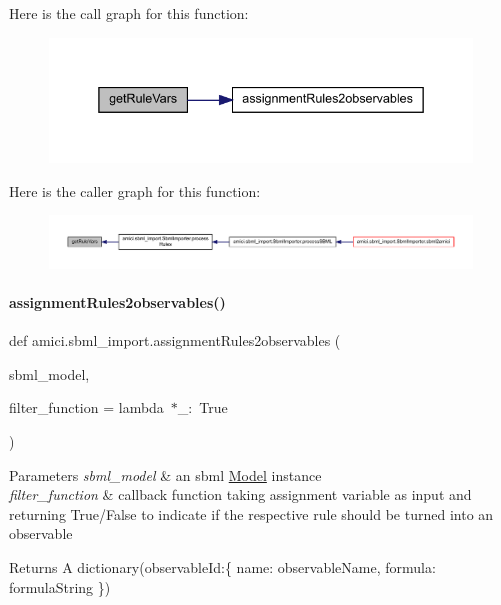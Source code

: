 Here is the call graph for this function\+:
\nopagebreak
\begin{figure}[H]
\begin{center}
\leavevmode
\includegraphics[width=338pt]{namespaceamici_1_1sbml__import_a64a5d0187cb4b3f69bceceb7d5638691_cgraph}
\end{center}
\end{figure}
Here is the caller graph for this function\+:
\nopagebreak
\begin{figure}[H]
\begin{center}
\leavevmode
\includegraphics[width=350pt]{namespaceamici_1_1sbml__import_a64a5d0187cb4b3f69bceceb7d5638691_icgraph}
\end{center}
\end{figure}
\mbox{\label{namespaceamici_1_1sbml__import_aaba72ac8b7d363e7720f36495ccc3285}} 
\paragraph{\texorpdfstring{assignment\+Rules2observables()}{assignmentRules2observables()}}
{\footnotesize\ttfamily def amici.\+sbml\+\_\+import.\+assignment\+Rules2observables (\begin{DoxyParamCaption}\item[{}]{sbml\+\_\+model,  }\item[{}]{filter\+\_\+function = {\ttfamily lambda~$\ast$\+\_\+\+:~True} }\end{DoxyParamCaption})}


\begin{DoxyParams}{Parameters}
{\em sbml\+\_\+model} & an sbml \mbox{\hyperlink{classamici_1_1_model}{Model}} instance\\
\hline
{\em filter\+\_\+function} & callback function taking assignment variable as input and returning True/\+False to indicate if the respective rule should be turned into an observable\\
\hline
\end{DoxyParams}
\begin{DoxyReturn}{Returns}
A dictionary(observable\+Id\+:\{ \textquotesingle{}name\textquotesingle{}\+: observable\+Name, \textquotesingle{}formula\textquotesingle{}\+: formula\+String \}) 
\end{DoxyReturn}


